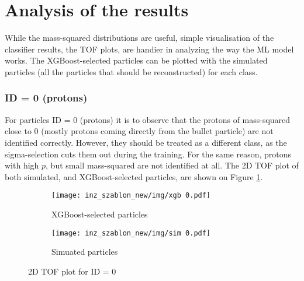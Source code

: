 \section{Analysis of the results}
While the mass-squared distributions are useful, simple visualisation of the classifier results, the TOF plots, are handier in analyzing the way the ML model works. The XGBoost-selected particles can be plotted with the simulated particles (all the particles that should be reconstructed) for each class.

\subsubsection{ID = 0 (protons)}
For particles ID = 0 (protons) it is to observe that the protons of mass-squared close to 0 (mostly protons coming directly from the bullet particle) are not identified correctly. However, they should be treated as a different class, as the sigma-selection cuts them out during the training. For the same reason, protons with high $p$, but small mass-squared are not identified at all. The 2D TOF plot of both simulated, and XGBoost-selected particles, are shown on Figure \ref{2D TOF id0}.
\begin{figure}[H]
 \centering
    \begin{subfigure}[b]{0.8\linewidth} 
        \centering
        \texttt{[image: inz\_szablon\_new/img/xgb 0.pdf]}
        \caption{XGBoost-selected particles}
        \vspace{0.3cm}
    \end{subfigure}
     \hfill
       \begin{subfigure}[b]{0.8\linewidth}
        \centering
        \texttt{[image: inz\_szablon\_new/img/sim 0.pdf]}
        \caption{Simuated particles}
        \vspace{0.3cm}
    \end{subfigure}
    \caption{2D TOF plot for ID = 0}
    \label{2D TOF id0}
\end{figure}
\clearpage

